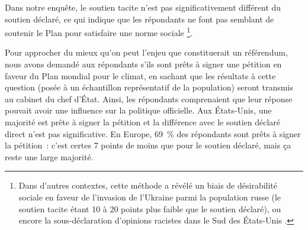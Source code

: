 \documentclass[a5paper,french]{memoir}
\begin{document}
Dans notre enquête, le soutien tacite n'est pas significativement différent du soutien déclaré, ce qui indique que les répondants ne font pas semblant de soutenir le Plan pour satisfaire une norme sociale%
\footnote{Dans d'autres contextes, cette méthode a révélé un biais de désirabilité sociale en faveur de l'invasion de l'Ukraine parmi la population russe (le soutien tacite étant 10 à 20 points plus faible que le soutien déclaré), ou encore la sous-déclaration d'opinions racistes dans le Sud des États-Unis \citep{kuklinski_racial_1997,chapkovski_solid_2022}.}. 

Pour approcher du mieux qu'on peut l'enjeu que constituerait un référendum, nous avons demandé aux répondants s'ils sont prêts à signer une pétition en faveur du Plan mondial pour le climat, en sachant que les résultats à cette question (posée à un échantillon représentatif de la population) seront transmis au cabinet du chef d'État. Ainsi, les répondants comprenaient que leur réponse pouvait avoir une influence sur la politique officielle. Aux États-Unis, une majorité est prête à signer la pétition et la différence avec le soutien déclaré direct n'est pas significative. En Europe, 69~\% des répondants sont prêts à signer la pétition~: c'est certes 7 points de moins que pour le soutien déclaré, mais ça reste une large majorité. 
\end{document}
